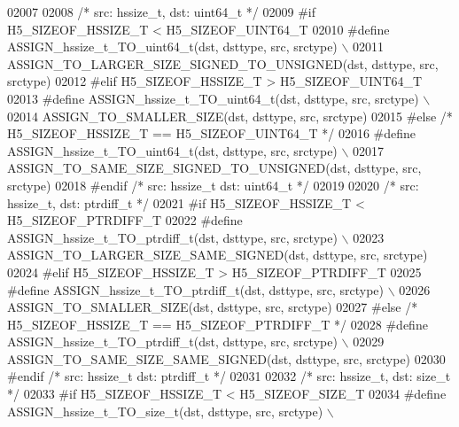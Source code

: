 \begin{DoxyCode}
02007 
02008 \textcolor{comment}{/* src: hssize\_t, dst: uint64\_t */}
02009 \textcolor{preprocessor}{#if H5\_SIZEOF\_HSSIZE\_T < H5\_SIZEOF\_UINT64\_T}
02010 \textcolor{preprocessor}{    #define ASSIGN\_hssize\_t\_TO\_uint64\_t(dst, dsttype, src, srctype) \(\backslash\)}
02011 \textcolor{preprocessor}{        ASSIGN\_TO\_LARGER\_SIZE\_SIGNED\_TO\_UNSIGNED(dst, dsttype, src, srctype)}
02012 \textcolor{preprocessor}{#elif H5\_SIZEOF\_HSSIZE\_T > H5\_SIZEOF\_UINT64\_T}
02013 \textcolor{preprocessor}{    #define ASSIGN\_hssize\_t\_TO\_uint64\_t(dst, dsttype, src, srctype) \(\backslash\)}
02014 \textcolor{preprocessor}{        ASSIGN\_TO\_SMALLER\_SIZE(dst, dsttype, src, srctype)}
02015 \textcolor{preprocessor}{#else }\textcolor{comment}{/* H5\_SIZEOF\_HSSIZE\_T == H5\_SIZEOF\_UINT64\_T */}\textcolor{preprocessor}{}
02016 \textcolor{preprocessor}{    #define ASSIGN\_hssize\_t\_TO\_uint64\_t(dst, dsttype, src, srctype) \(\backslash\)}
02017 \textcolor{preprocessor}{        ASSIGN\_TO\_SAME\_SIZE\_SIGNED\_TO\_UNSIGNED(dst, dsttype, src, srctype)}
02018 \textcolor{preprocessor}{#endif }\textcolor{comment}{/* src: hssize\_t dst: uint64\_t */}\textcolor{preprocessor}{}
02019 
02020 \textcolor{comment}{/* src: hssize\_t, dst: ptrdiff\_t */}
02021 \textcolor{preprocessor}{#if H5\_SIZEOF\_HSSIZE\_T < H5\_SIZEOF\_PTRDIFF\_T}
02022 \textcolor{preprocessor}{    #define ASSIGN\_hssize\_t\_TO\_ptrdiff\_t(dst, dsttype, src, srctype) \(\backslash\)}
02023 \textcolor{preprocessor}{        ASSIGN\_TO\_LARGER\_SIZE\_SAME\_SIGNED(dst, dsttype, src, srctype)}
02024 \textcolor{preprocessor}{#elif H5\_SIZEOF\_HSSIZE\_T > H5\_SIZEOF\_PTRDIFF\_T}
02025 \textcolor{preprocessor}{    #define ASSIGN\_hssize\_t\_TO\_ptrdiff\_t(dst, dsttype, src, srctype) \(\backslash\)}
02026 \textcolor{preprocessor}{        ASSIGN\_TO\_SMALLER\_SIZE(dst, dsttype, src, srctype)}
02027 \textcolor{preprocessor}{#else }\textcolor{comment}{/* H5\_SIZEOF\_HSSIZE\_T == H5\_SIZEOF\_PTRDIFF\_T */}\textcolor{preprocessor}{}
02028 \textcolor{preprocessor}{    #define ASSIGN\_hssize\_t\_TO\_ptrdiff\_t(dst, dsttype, src, srctype) \(\backslash\)}
02029 \textcolor{preprocessor}{        ASSIGN\_TO\_SAME\_SIZE\_SAME\_SIGNED(dst, dsttype, src, srctype)}
02030 \textcolor{preprocessor}{#endif }\textcolor{comment}{/* src: hssize\_t dst: ptrdiff\_t */}\textcolor{preprocessor}{}
02031 
02032 \textcolor{comment}{/* src: hssize\_t, dst: size\_t */}
02033 \textcolor{preprocessor}{#if H5\_SIZEOF\_HSSIZE\_T < H5\_SIZEOF\_SIZE\_T}
02034 \textcolor{preprocessor}{    #define ASSIGN\_hssize\_t\_TO\_size\_t(dst, dsttype, src, srctype) \(\backslash\)}

\end{DoxyCode}
